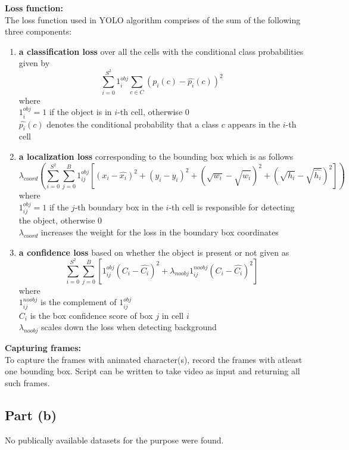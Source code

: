 \documentclass[twosided]{article}
\begin{document}
\textbf{Loss function:} \\
The loss function used in YOLO algorithm comprises of the sum of the following three components:
\begin{enumerate}
    \item \textbf{a classification loss} over all the cells with the conditional class probabilities given by 
    \[ \sum_{i=0}^{S^2} 1_i^{obj} \sum_{c \in C} (p_i(c) - \hat{p_i}(c))^2 \]
    where \\
    \( 1_i^{obj} = 1\) if the object is in $i$-th cell, otherwise 0 \\
    \( \hat{p_i}(c) \) denotes the conditional probability that a class $c$ appears in the $i$-th cell
    \item \textbf{a localization loss} corresponding to the bounding box which is as follows
    \[ \lambda_{coord} \left( \sum_{i=0}^{S^2} \sum_{j=0}^{B} 1_{ij}^{obj} \left[(x_i - \hat{x_i})^2 + (y_i - \hat{y_i})^2 + (\sqrt{w_i} - \sqrt{\hat{w_i}})^2 + (\sqrt{h_i} - \sqrt{\hat{h_i}})^2 \right] \right) \]
    where \\ 
    \( 1_{ij}^{obj} = 1\) if the $j$-th boundary box in the $i$-th cell is responsible for detecting the object, otherwise 0 \\
    $\lambda_{coord}$ increases the weight for the loss in the boundary box coordinates
    \item \textbf{a confidence loss} based on whether the object is present or not given as
    \[ \sum_{i=0}^{S^2} \sum_{j=0}^{B} \left[ 1_{ij}^{obj} (C_i - \hat{C_i})^2 + \lambda_{noobj} 1_{ij}^{noobj} (C_i - \hat{C_i})^2 \right] \]
    where \\
    \( 1_{ij}^{noobj} \) is the complement of \( 1_{ij}^{obj}\) \\
    \( C_i \) is the box confidence score of box $j$ in cell $i$ \\
    $\lambda_{noobj}$ scales down the loss when detecting background
\end{enumerate}

\textbf{Capturing frames:} \\
To capture the frames with animated character(s), record the frames with atleast one bounding box. Script can be written to take video as input and returning all such frames.

\subsection{Part (b)}
No publically available datasets for the purpose were found.
\end{document}
